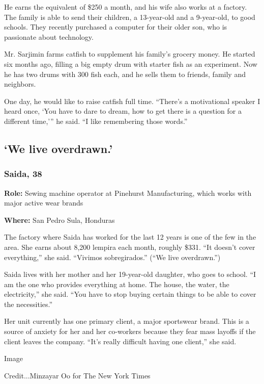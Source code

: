 He earns the equivalent of \$250 a month, and his wife also works at a
factory. The family is able to send their children, a 13-year-old and a
9-year-old, to good schools. They recently purchased a computer for
their older son, who is passionate about technology.

Mr. Sarjimin farms catfish to supplement his family's grocery money. He
started six months ago, filling a big empty drum with starter fish as an
experiment. Now he has two drums with 300 fish each, and he sells them
to friends, family and neighbors.

One day, he would like to raise catfish full time. ``There's a
motivational speaker I heard once, `You have to dare to dream, how to
get there is a question for a different time,''' he said. ``I like
remembering those words.''

\hypertarget{we-live-overdrawn}{%
\subsection{`We live overdrawn.'}\label{we-live-overdrawn}}

\hypertarget{saida-38-}{%
\subsubsection{Saida, 38 }\label{saida-38-}}

\textbf{Role:} Sewing machine operator at Pinehurst Manufacturing, which
works with major active wear brands

\textbf{Where:} San Pedro Sula, Honduras

The factory where Saida has worked for the last 12 years is one of the
few in the area. She earns about 8,200 lempira each month, roughly
\$331. ``It doesn't cover everything,'' she said. ``Vivimos
sobregirados.'' (``We live overdrawn.'')

Saida lives with her mother and her 19-year-old daughter, who goes to
school. ``I am the one who provides everything at home. The house, the
water, the electricity,'' she said. ``You have to stop buying certain
things to be able to cover the necessities.''

Her unit currently has one primary client, a major sportswear brand.
This is a source of anxiety for her and her co-workers because they fear
mass layoffs if the client leaves the company. ``It's really difficult
having one client,'' she said.

Image

Credit...Minzayar Oo for The New York Times

